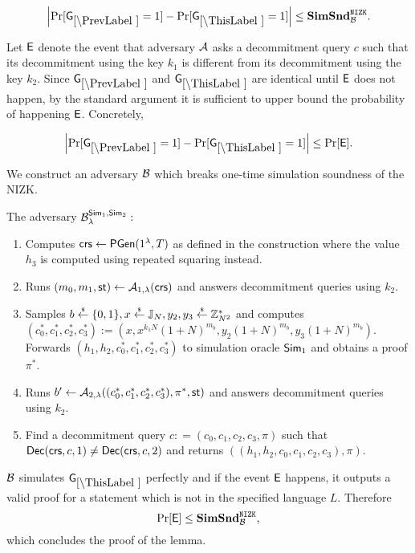 \begin{lemma}
\[
\left|\Pr[\games_\prevgame = 1] - \Pr[\games_\thisgame = 1]\right| \leq \simsnd^\nizk_\advB. 
\]
\end{lemma}

Let $\mathsf{E}$ denote the event that adversary $\mathcal{A}$ asks a decommitment query $c$ such that its decommitment using the key $k_1$ is different from its decommitment using the key $k_2$. Since $\games_\prevgame$ and $\games_\thisgame$ are identical until $\mathsf{E}$ does not happen, by the standard argument it is sufficient to upper bound the probability of happening $\mathsf{E}$. Concretely,  

\[
\left|\Pr[\games_\prevgame = 1] - \Pr[\games_\thisgame = 1]\right| \leq \Pr[\event]. 
\]

We construct an adversary $\mathcal{B}$ which breaks one-time simulation soundness of the NIZK. 

The adversary $\mathcal{B}_{\lambda}^{\mathsf{Sim}_1, \mathsf{Sim}_2}:$
\vspace{-2mm}
\begin{enumerate}
\item Computes $\mathsf{crs} \leftarrow \mathsf{PGen}(1{^{\lambda}}, T)$ as defined in the construction where the value $h_3$ is computed using repeated squaring instead.
\item Runs $(m_0, m_1, \mathsf{st}) \leftarrow \mathcal{A}_{1, \lambda}(\mathsf{crs})$ and answers decommitment queries using $k_2$.
\item Samples $b \stackrel{{\scriptscriptstyle\$}}{\leftarrow} \{0,1\}, x \stackrel{{\scriptscriptstyle\$}}{\leftarrow} \mathbb{J}_N, y_2, y_3 \stackrel{{\scriptscriptstyle\$}}{\leftarrow} \mathbb{Z}_{N^2}^*$ and computes $(c_0^*, c_1^*, c_2^*, c_3^*):=(x, x^{k_1 N} (1+N)^{m_b}, y_2 (1+N)^{m_b}, y_3 (1+N)^{m_b})$. Forwards $(h_1, h_2, c_0^*, c_1^*, c_2^*, c_3^*)$ to simulation oracle $\mathsf{Sim}_1$ and obtains a proof $\pi^*$.
\item Runs $b' \leftarrow \mathcal{A}_{2, \lambda}((c_0^*, c_1^*, c_2^*, c_3^*), \pi^*, \mathsf{st})$ and answers decommitment queries using $k_2$.
\item Find a decommitment query $c: = (c_0, c_1, c_2, c_3, \pi)$ such that $\mathsf{Dec}(\mathsf{crs}, c, 1) \neq \mathsf{Dec}(\mathsf{crs},c,2)$ and returns $((h_1, h_2, c_0, c_1, c_2, c_3), \pi)$.
\end{enumerate}

$\mathcal{B}$ simulates $\games_\thisgame$ perfectly and if the event $\mathsf{E}$ happens, it outputs a valid proof for a statement which is not in the specified language $L$. Therefore
\[\Pr[\mathsf{E}] \leq \mathbf{SimSnd}^{\mathtt{NIZK}}_{\mathcal{B}},\]
which concludes the proof of the lemma.  

%
%
%

